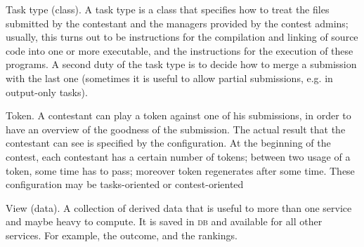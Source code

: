 \documentclass[a4paper,8pt]{amsart}
\newcommand{\DB}{\textsc{db}}
\newenvironment{squishlist}{%
  \begin{list}{\textbullet}%
    { \setlength{\itemsep}{0pt}%
      \setlength{\parsep}{3pt}%
      \setlength{\topsep}{3pt}%
      \setlength{\partopsep}{0pt}%
      \setlength{\leftmargin}{1.5em}%
      \setlength{\labelwidth}{1em}%
      \setlength{\labelsep}{0.5em} }%
}{\end{list}}
\begin{document}
\begin{multicols}{2}
\begin{squishlist}
  \item[Task type (class).] A task type is a class that specifies how
    to treat the files submitted by the contestant and the managers
    provided by the contest admins; usually, this turns out to be
    instructions for the compilation and linking of source code into
    one or more executable, and the instructions for the execution of
    these programs. A second duty of the task type is to decide how to
    merge a submission with the last one (sometimes it is useful to
    allow partial submissions, e.g. in output-only tasks).
  \item[Token.] A contestant can play a token against one of his
    submissions, in order to have an overview of the goodness of the
    submission. The actual result that the contestant can see is
    specified by the configuration. At the beginning of the contest,
    each contestant has a certain number of tokens; between two usage
    of a token, some time has to pass; moreover token regenerates
    after some time. These configuration may be tasks-oriented or
    contest-oriented
  \item[View (data).] A collection of derived data that is useful to
    more than one service and maybe heavy to compute. It is saved in
    \DB{} and available for all other services. For example, the
    outcome, and the rankings.
  \end{squishlist}
\end{multicols}
\end{document}
